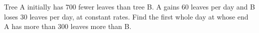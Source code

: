 Tree A initially has $700$ fewer leaves than tree B. A gains $60$ leaves per day and B loses $30$ leaves per day, at constant rates. Find the first whole day at whose end A has more than $300$ leaves more than B.
